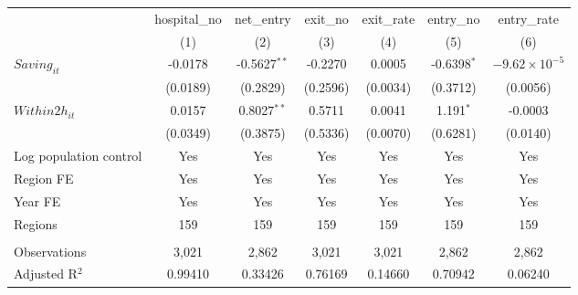 \begingroup
\centering
\begin{tabular}{lcccccc}
   \toprule
                          & hospital\_no  & net\_entry     & exit\_no  & exit\_rate  & entry\_no     & entry\_rate \\    
                          & (1)           & (2)            & (3)       & (4)         & (5)           & (6)\\  
   \midrule 
   $Saving_{it}$          & -0.0178       & -0.5627$^{**}$ & -0.2270   & 0.0005      & -0.6398$^{*}$ & $-9.62\times 10^{-5}$\\    
                          & (0.0189)      & (0.2829)       & (0.2596)  & (0.0034)    & (0.3712)      & (0.0056)\\   
   $Within2h_{it}$        & 0.0157        & 0.8027$^{**}$  & 0.5711    & 0.0041      & 1.191$^{*}$   & -0.0003\\   
                          & (0.0349)      & (0.3875)       & (0.5336)  & (0.0070)    & (0.6281)      & (0.0140)\\   
   Log population control & Yes           & Yes            & Yes       & Yes         & Yes           & Yes\\  
   Region FE              & Yes           & Yes            & Yes       & Yes         & Yes           & Yes\\  
   Year FE                & Yes           & Yes            & Yes       & Yes         & Yes           & Yes\\  
   Regions                & 159           & 159            & 159       & 159         & 159           & 159\\  
    \\
   Observations           & 3,021         & 2,862          & 3,021     & 3,021       & 2,862         & 2,862\\  
   Adjusted R$^2$         & 0.99410       & 0.33426        & 0.76169   & 0.14660     & 0.70942       & 0.06240\\  
   \bottomrule
\end{tabular}
\par\endgroup
